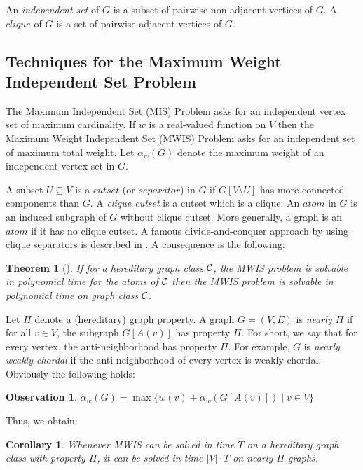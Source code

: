 \documentclass[11pt]{article}
\newcommand{\0}{\text{ has a co-join to }}
\newcommand{\1}{\text{ has a join to }}
\newtheorem{theo}{Theorem}
\newtheorem{coro}{Corollary}
\newtheorem{obse}{Observation}
\begin{document}
An {\em independent set} of $G$ is a subset of pairwise non-adjacent vertices of $G$. A $clique$ of $G$ is a set of pairwise adjacent vertices of $G$.

\subsection{Techniques for the Maximum Weight Independent Set Problem}
 
The Maximum Independent Set (MIS) Problem asks for an independent vertex set of maximum cardinality. If $w$ is a real-valued function on $V$ then the Maximum Weight Independent Set (MWIS) Problem asks for an independent set of maximum total weight. Let $\alpha_w(G)$ denote the maximum weight of an independent vertex set in $G$.

A subset $U \subseteq V$ is a $cutset$ (or $separator$) in $G$ if $G[V \setminus U]$ has more connected components than $G$. A {\em clique cutset} is a cutset which is a clique. An $atom$ in $G$ is an induced subgraph of $G$ without clique cutset. More generally, a graph is an $atom$ if it has no clique cutset. A famous divide-and-conquer approach by using clique separators is described in \cite{Tarjan1985,White1984}. A consequence is the following:

\begin{theo}[\cite{Tarjan1985,White1984}]\label{MWISatomred}
If for a hereditary graph class ${\cal C}$, the MWIS problem is solvable in polynomial time for the atoms of ${\cal C}$ then the MWIS problem is solvable in polynomial time on graph class ${\cal C}$.
\end{theo}

Let $\Pi$ denote a (hereditary) graph property. A graph $G=(V,E)$ is {\em nearly $\Pi$} if for all $v \in V$, the subgraph $G[A(v)]$ has property $\Pi$. For short, we say that for every vertex, the anti-neighborhood has property $\Pi$. For example, $G$ is {\em nearly weakly chordal} if the anti-neighborhood of every vertex is weakly chordal. Obviously the following holds:

\begin{obse}
$\alpha_w(G) = \max\{w(v) + \alpha_w(G[A(v)]) \mid v \in V\}$
\end{obse}

Thus, we obtain: 

\begin{coro}\label{nearlyPiMWIS}
Whenever MWIS can be solved in time $T$ on a hereditary graph class with property $\Pi$, it can be solved in time $|V| \cdot T$ on nearly $\Pi$ graphs. 
\end{coro}
\end{document}
